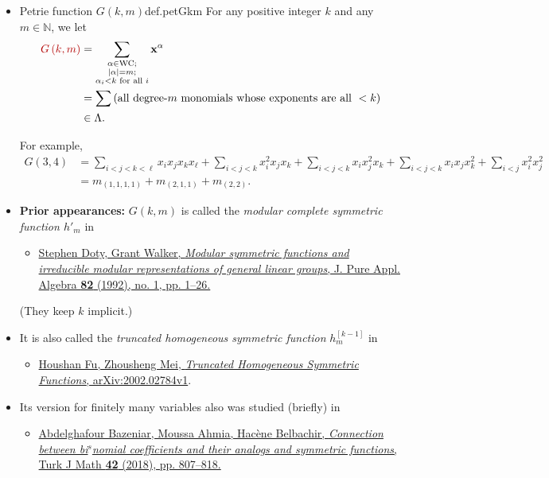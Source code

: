 \documentclass[numbers=enddot,12pt,final,onecolumn,notitlepage]{scrartcl}%
\newcommand{\red}{\color{red}}
\newcommand{\defnm}[1]{{\color{darkred} #1}}
\newcommand{\0}{\phantom{c}}
\let\sumnonlimits\sum
\renewcommand{\sum}{\sumnonlimits\limits}
\newcommand{\nowbox}{\hphantom{x} \vspace{-1.5pc}}
\begin{document}
\begin{itemize}
\item \nowbox
\begin{definition}{Petrie function $G(k,m)$}{def.petGkm}
For any positive integer $k$ and any $m\in\mathbb{N}$, we let%
\begin{align*}
\defnm{G\left( k,m\right)}  &  =\sum_{\substack{\alpha\in\operatorname*{WC}%
;\\\left\vert \alpha\right\vert =m;\\\alpha_{i}<k\text{ for all }i}%
}\mathbf{x}^{\alpha}\\
&  =\sum\left(  \text{all degree-}m\text{ monomials whose exponents are all
}<k\right) \\
&  \in\Lambda.
\end{align*}
\end{definition}

For example,%
\begin{align*}
G\left(  3,4\right)   &  =\sum_{i<j<k<\ell}x_{i}x_{j}x_{k}x_{\ell}%
+\sum_{i<j<k}x_{i}^{2}x_{j}x_{k}+\sum_{i<j<k}x_{i}x_{j}^{2}x_{k}+\sum
_{i<j<k}x_{i}x_{j}x_{k}^{2}+\sum_{i<j}x_{i}^{2}x_{j}^{2}\\
&  =m_{\left(  1,1,1,1\right)  }+m_{\left(  2,1,1\right)  }+m_{\left(
2,2\right)  }.
\end{align*}

\item \textbf{Prior appearances:} $G\left(k, m\right)$ is called the
\emph{modular complete symmetric function $h'_m$} in
\begin{itemize}
\item {\red \href{https://doi.org/10.1016/0022-4049(92)90007-3}{Stephen Doty, Grant
Walker, \textit{Modular symmetric functions and irreducible modular
representations of general linear groups}, J. Pure Appl. Algebra \textbf{82}
(1992), no. 1, pp. 1--26.}}
\end{itemize}
(They keep $k$ implicit.)

\item It is also called the
\emph{truncated homogeneous symmetric function}
$h_{m}^{\left[  k-1\right]  }$
in
\begin{itemize}
\item {\red \href{https://arxiv.org/abs/2002.02784v1}{Houshan
Fu, Zhousheng Mei, \textit{Truncated Homogeneous Symmetric Functions},
arXiv:2002.02784v1}. }
\end{itemize}

\item Its version for finitely many variables also was studied (briefly) in
\begin{itemize}
\item {\red
\href{https://doi.org/10.3906/mat-1705-27}{Abdelghafour Bazeniar, Moussa Ahmia, Hac\`{e}ne
Belbachir, \textit{Connection between bi}$^{s}$\textit{nomial coefficients and
their analogs and symmetric functions}, Turk J Math \textbf{42} (2018), pp.
807--818.}}
\end{itemize}
\end{itemize}
\end{document}
